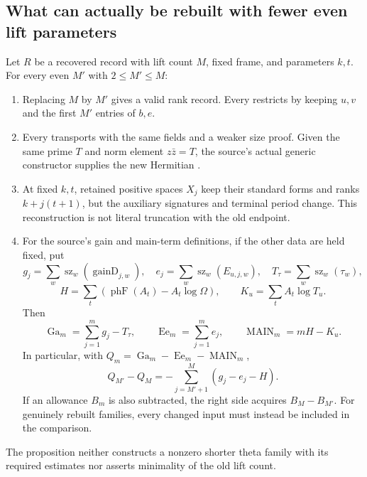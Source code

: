 \subsection{What can actually be rebuilt with fewer even lift parameters}

\begin{proposition}\label{DP44}
Let $R$ be a recovered  record with lift count $M$, fixed frame, and parameters $k,t$. For every even $M'$ with $2\le M'\le M$:
\begin{enumerate}[label=(\alph*),leftmargin=*]
\item Replacing $M$ by $M'$ gives a valid rank record. Every  restricts by keeping $u,v$ and the first $M'$ entries of $b,e$.
\item Every  transports with the same fields and a weaker size proof. Given the same prime $T$ and norm element $z\bar z=T$, the source's actual generic constructor supplies the new Hermitian .
\item At fixed $k,t$, retained positive spaces $X_j$ keep their standard forms and ranks $k+j(t+1)$, but the auxiliary signatures and terminal period change. This reconstruction is not literal truncation with the old endpoint.
\item For the source's gain and main-term definitions, if the other data are held fixed, put
\[
 g_j=\sum_w\operatorname{sz}_w(\operatorname{gainD}_{j,w}),\quad
 e_j=\sum_w\operatorname{sz}_w(E_{u,j,w}),\quad
 T_\tau=\sum_w\operatorname{sz}_w(\tau_w),
\]
\[
 H=\sum_t(\operatorname{phF}(A_t)-A_t\log\Omega),\qquad
 K_u=\sum_t A_t\log T_u.
\]
Then
\[
 \operatorname{Ga}_m=\sum_{j=1}^m g_j-T_\tau,\qquad
 \operatorname{Ee}_m=\sum_{j=1}^m e_j,\qquad
 \operatorname{MAIN}_m=mH-K_u.
\]
In particular, with $Q_m=\operatorname{Ga}_m-\operatorname{Ee}_m-\operatorname{MAIN}_m$,
\[
 Q_{M'}-Q_M=-\sum_{j=M'+1}^{M}(g_j-e_j-H).
\]
If an allowance $B_m$ is also subtracted, the right side acquires $B_M-B_{M'}$. For genuinely rebuilt families, every changed input must instead be included in the comparison.
\end{enumerate}
The proposition neither constructs a nonzero shorter theta family with its required estimates nor asserts minimality of the old lift count.
\end{proposition}

